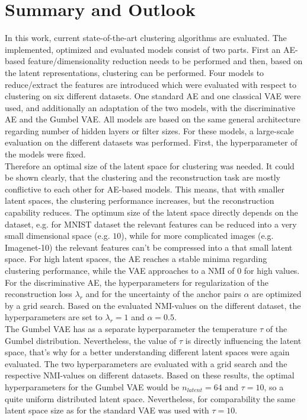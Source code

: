 \documentclass[12pt,DIV14,BCOR12mm,a4paper,footexclude,headinclude,halfparskip-,twoside,openright,cleardoubleempty,idxtotoc,bibtotoc,listtotoc,abstracton]{scrreprt} %
\numberwithin{equation}{chapter}
\begin{document}
\chapter{Summary and Outlook}
In this work, current state-of-the-art clustering algorithms are evaluated. The implemented, optimized and evaluated models consist of two parts. First an AE-based feature/dimensionality reduction needs to be performed and then, based on the latent representations, clustering can be performed. Four models to reduce/extract the features are introduced which were evaluated with respect to clustering on six different datasets. One standard AE and one classical VAE were used, and additionally an adaptation of the two models, with the discriminative AE and the Gumbel VAE. All models are based on the same general architecture regarding number of hidden layers or filter sizes. For these models, a large-scale evaluation on the different datasets was performed. First, the hyperparameter of the models were fixed.\\
Therefore an optimal size of the latent space for clustering was needed. It could be shown clearly, that the clustering and the reconstruction task are mostly conflictive to each other for AE-based models. This means, that with smaller latent spaces, the clustering performance increases, but the reconstruction capability reduces. The optimum size of the latent space directly depends on the dataset, e.g. for MNIST dataset the relevant features can be reduced into a very small dimensional space (e.g. $10$), while for more complicated images (e.g. Imagenet-10) the relevant features can't be compressed into a that small latent space. For high latent spaces, the AE reaches a stable minima regarding clustering performance, while the VAE approaches to a NMI of $0$ for high values.\\
For the discriminative AE, the hyperparameters for regularization of the reconstruction loss $\lambda_r$ and for the uncertainty of the anchor pairs $\alpha$ are optimized by a grid search. Based on the evaluated NMI-values on the different dataset, the hyperparameters are set to $\lambda_r=1$ and $\alpha=0.5$.\\
The Gumbel VAE has as a separate hyperparameter the temperature $\tau$ of the Gumbel distribution. Nevertheless, the value of $\tau$ is directly influencing the latent space, that's why for a better understanding different latent spaces were again evaluated. The two hyperparameters are evaluated with a grid search and the respective NMI-values on different datasets. Based on these results, the optimal hyperparameters for the Gumbel VAE would be $n_{latent}=64$ and $\tau=10$, so a quite uniform distributed latent space. Nevertheless, for comparability the same latent space size as for the standard VAE was used with $\tau=10$.\\
\end{document}
